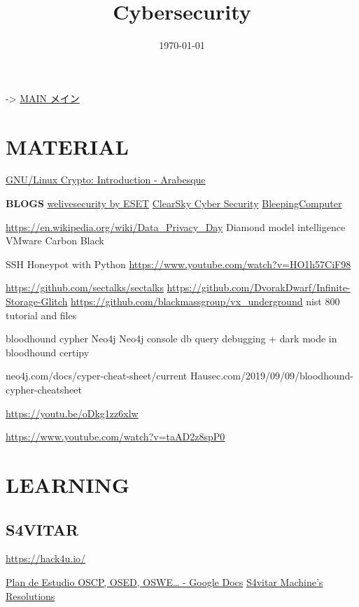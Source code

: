 \documentclass[11pt]{article}
\date{\today}
\title{Cybersecurity}
\begin{document}
\maketitle
\tableofcontents

-> \href{../../../index.org}{MAIN メイン}

\section{MATERIAL}
\label{sec:org502823a}

\href{https://blog.sanctum.geek.nz/series/gnu-linux-crypto/}{GNU/Linux Crypto: Introduction - Arabesque}

\textbf{BLOGS}
\href{https://www.welivesecurity.com}{welivesecurity by ESET}
\href{https://www.clearskysec.com}{ClearSky Cyber Security}
\href{https://www.bleepingcomputer.com}{BleepingComputer}

\url{https://en.wikipedia.org/wiki/Data\_Privacy\_Day}
Diamond model intelligence
VMware Carbon Black

SSH Honeypot with Python
\url{https://www.youtube.com/watch?v=HO1h57CiF98}

\url{https://github.com/sectalks/sectalks}
\url{https://github.com/DvorakDwarf/Infinite-Storage-Glitch}
\url{https://github.com/blackmassgroup/vx\_underground}
nist 800 tutorial and files

bloodhound
cypher
Neo4j
Neo4j console db
query debugging + dark mode in bloodhound
certipy

neo4j.com/docs/cyper-cheat-sheet/current
Hausec.com/2019/09/09/bloodhound-cypher-cheatsheet


\url{https://youtu.be/oDkg1zz6xlw}

\url{https://www.youtube.com/watch?v=taAD2z8spP0}

\section{LEARNING}
\label{sec:orga74e943}
\subsection{S4VITAR}
\label{sec:orgbf6f91a}

\url{https://hack4u.io/}

\href{https://docs.google.com/spreadsheets/d/1dzvaGlT\_0xnT-PGO27Z\_4prHgA8PHIpErmoWdlUrSoA/edit\#gid=0}{Plan de Estudio OSCP, OSED, OSWE\ldots{} - Google Docs}
\href{https://infosecmachines.io/}{S4vitar Machine's Resolutions}
\end{document}
